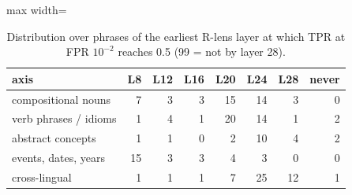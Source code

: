 \begin{table}[t]
\centering
\footnotesize
\caption{Distribution over phrases of the earliest R-lens layer at which TPR at FPR $10^{-2}$ reaches 0.5 (99 = not by layer 28).}
\label{tab:gen_earliest}
\begin{adjustbox}{max width=\textwidth}
\begin{tabular}{lrrrrrrr}
\toprule
axis & L8 & L12 & L16 & L20 & L24 & L28 & never \\
\midrule
compositional nouns & 7 & 3 & 3 & 15 & 14 & 3 & 0 \\
verb phrases / idioms & 1 & 4 & 1 & 20 & 14 & 1 & 2 \\
abstract concepts & 1 & 1 & 0 & 2 & 10 & 4 & 2 \\
events, dates, years & 15 & 3 & 3 & 4 & 3 & 0 & 0 \\
cross-lingual & 1 & 1 & 1 & 7 & 25 & 12 & 1 \\
\bottomrule
\end{tabular}
\end{adjustbox}
\end{table}